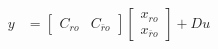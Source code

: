 \documentclass[twoside]{article}
\begin{document}
\begin{itemize}
\begin{align*}
        \\
        y &= \left[ \begin{array}{c|c} C_{ro} & C_{\bar{r}o} \end{array} \right] \begin{bmatrix} x_{ro} \\ x_{\bar{r}o}\end{bmatrix} + D u
    \end{align*}
\end{itemize}


\end{document}
